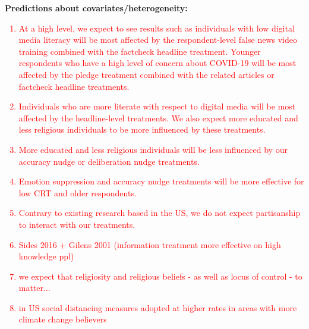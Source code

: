 \documentclass[letterpaper, 12pt, parskip=full,]{scrartcl}
\begin{document}




\textbf{Predictions about covariates/heterogeneity:}
\textcolor{red}{
\begin{enumerate}
\item At a high level, we expect to see results such as individuals with low digital media literacy will be most affected by the respondent-level false news video training combined with the factcheck headline treatment. Younger respondents who have a high level of concern about COVID-19 will be most affected by the pledge treatment combined with the related articles or factcheck headline treatments.
\item Individuals who are more literate with respect to digital media will be most affected by the headline-level treatments. We also expect more educated and less religious individuals to be more influenced by these treatments.
\item More educated and less religious individuals will be less influenced by our accuracy nudge or deliberation nudge treatments.
\item Emotion suppression and accuracy nudge treatments will be more effective for low CRT and older respondents.
\item Contrary to existing research based in the US, we do not expect partisanship to interact with our treatments.
\item Sides 2016 + Gilens 2001 (information treatment more effective on high knowledge ppl)
\item we expect that religiosity and religious beliefs - as well as locus of control - to matter...
\item in US social distancing measures adopted at higher rates in areas with more climate change believers %
\end{enumerate}
}

\end{document}
